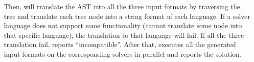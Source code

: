 Then, \imss will translate the AST into all the three input formats by traversing the tree and
translate each tree node into a string format of each language. If a solver language does not support
some functionality (\imss cannot translate some node into that specific language),
the translation to that language will fail. If all the three translation fail, \imss
reports ``incompatible''. After that, \imss executes all the generated input formats on the
corresponding solvers in parallel and reports the solution.
